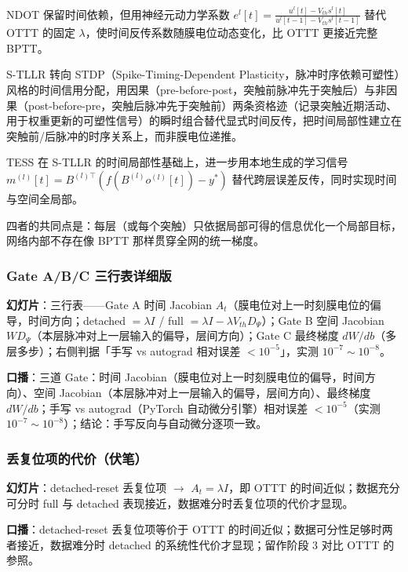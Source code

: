 \documentclass[journal,12pt,onecolumn]{IEEEtran}
\begin{document}
NDOT \cite{jiang_ndot_nodate} 保留时间依赖，但用神经元动力学系数 $e^l[t]=\frac{u^l[t]-V_{th}s^l[t]}{u^l[t-1]-V_{th}s^l[t-1]}$ 替代 OTTT 的固定 $\lambda$，使时间反传系数随膜电位动态变化，比 OTTT 更接近完整 BPTT。

S-TLLR \cite{apolinario_s-tllr_2024} 转向 STDP（Spike-Timing-Dependent Plasticity，脉冲时序依赖可塑性）风格的时间信用分配，用因果（pre-before-post，突触前脉冲先于突触后）与非因果（post-before-pre，突触后脉冲先于突触前）两条资格迹（记录突触近期活动、用于权重更新的可塑性信号）的瞬时组合替代显式时间反传，把时间局部性建立在突触前/后脉冲的时序关系上，而非膜电位递推。

TESS \cite{apolinario_tess_2025} 在 S-TLLR 的时间局部性基础上，进一步用本地生成的学习信号 $m^{(l)}[t]=B^{(l)\top}(f(B^{(l)}o^{(l)}[t])-y^*)$ 替代跨层误差反传，同时实现时间与空间全局部。

四者的共同点是：每层（或每个突触）只依据局部可得的信息优化一个局部目标，网络内部不存在像 BPTT 那样贯穿全网的统一梯度。

\subsubsection{Gate A/B/C 三行表详细版}

\textbf{幻灯片}：三行表——Gate A 时间 Jacobian $A_t$（膜电位对上一时刻膜电位的偏导，时间方向；detached $=\lambda I$ / full $=\lambda I-\lambda V_{th}D_\Psi$）；Gate B 空间 Jacobian $W D_\Psi$（本层脉冲对上一层输入的偏导，层间方向）；Gate C 最终梯度 $dW/db$（多层多步）；右侧判据「手写 vs autograd 相对误差 $<10^{-5}$」，实测 $10^{-7}\sim10^{-8}$。

\textbf{口播}：三道 Gate：时间 Jacobian（膜电位对上一时刻膜电位的偏导，时间方向）、空间 Jacobian（本层脉冲对上一层输入的偏导，层间方向）、最终梯度 $dW/db$；手写 vs autograd（PyTorch 自动微分引擎）相对误差 $<10^{-5}$（实测 $10^{-7}\sim10^{-8}$）；结论：手写反向与自动微分逐项一致。

\subsubsection{丢复位项的代价（伏笔）}

\textbf{幻灯片}：detached-reset 丢复位项 $\to$ $A_t=\lambda I$，即 OTTT 的时间近似；数据充分可分时 full 与 detached 表现接近，数据难分时丢复位项的代价才显现。

\textbf{口播}：detached-reset 丢复位项等价于 OTTT 的时间近似；数据可分性足够时两者接近，数据难分时 detached 的系统性代价才显现；留作阶段 3 对比 OTTT 的参照。
\end{document}
